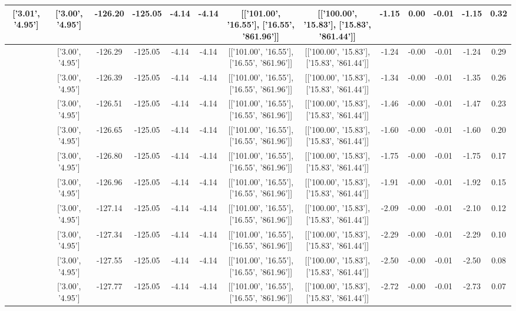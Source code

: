 \begin{table}[htbp]
\begin{adjustbox}{angle=90}
\begin{tabular}{|c|c|c|c|c|c|c|c|c|c|c|c|c|}
 ['3.01', '4.95'] & ['3.00', '4.95'] & -126.20 & -125.05 & -4.14 & -4.14 & [['101.00', '16.55'], ['16.55', '861.96']] & [['100.00', '15.83'], ['15.83', '861.44']] & -1.15 & 0.00 & -0.01 & -1.15 & 0.32\\ \hline
 ['3.01', '4.95'] & ['3.00', '4.95'] & -126.29 & -125.05 & -4.14 & -4.14 & [['101.00', '16.55'], ['16.55', '861.96']] & [['100.00', '15.83'], ['15.83', '861.44']] & -1.24 & -0.00 & -0.01 & -1.24 & 0.29\\ \hline
 ['3.01', '4.95'] & ['3.00', '4.95'] & -126.39 & -125.05 & -4.14 & -4.14 & [['101.00', '16.55'], ['16.55', '861.96']] & [['100.00', '15.83'], ['15.83', '861.44']] & -1.34 & -0.00 & -0.01 & -1.35 & 0.26\\ \hline
 ['3.01', '4.95'] & ['3.00', '4.95'] & -126.51 & -125.05 & -4.14 & -4.14 & [['101.00', '16.55'], ['16.55', '861.96']] & [['100.00', '15.83'], ['15.83', '861.44']] & -1.46 & -0.00 & -0.01 & -1.47 & 0.23\\ \hline
 ['3.01', '4.95'] & ['3.00', '4.95'] & -126.65 & -125.05 & -4.14 & -4.14 & [['101.00', '16.55'], ['16.55', '861.96']] & [['100.00', '15.83'], ['15.83', '861.44']] & -1.60 & -0.00 & -0.01 & -1.60 & 0.20\\ \hline
 ['3.01', '4.95'] & ['3.00', '4.95'] & -126.80 & -125.05 & -4.14 & -4.14 & [['101.00', '16.55'], ['16.55', '861.96']] & [['100.00', '15.83'], ['15.83', '861.44']] & -1.75 & -0.00 & -0.01 & -1.75 & 0.17\\ \hline
 ['3.01', '4.95'] & ['3.00', '4.95'] & -126.96 & -125.05 & -4.14 & -4.14 & [['101.00', '16.55'], ['16.55', '861.96']] & [['100.00', '15.83'], ['15.83', '861.44']] & -1.91 & -0.00 & -0.01 & -1.92 & 0.15\\ \hline
 ['3.01', '4.95'] & ['3.00', '4.95'] & -127.14 & -125.05 & -4.14 & -4.14 & [['101.00', '16.55'], ['16.55', '861.96']] & [['100.00', '15.83'], ['15.83', '861.44']] & -2.09 & -0.00 & -0.01 & -2.10 & 0.12\\ \hline
 ['3.02', '4.95'] & ['3.00', '4.95'] & -127.34 & -125.05 & -4.14 & -4.14 & [['101.00', '16.55'], ['16.55', '861.96']] & [['100.00', '15.83'], ['15.83', '861.44']] & -2.29 & -0.00 & -0.01 & -2.29 & 0.10\\ \hline
 ['3.02', '4.95'] & ['3.00', '4.95'] & -127.55 & -125.05 & -4.14 & -4.14 & [['101.00', '16.55'], ['16.55', '861.96']] & [['100.00', '15.83'], ['15.83', '861.44']] & -2.50 & -0.00 & -0.01 & -2.50 & 0.08\\ \hline
 ['3.02', '4.96'] & ['3.00', '4.95'] & -127.77 & -125.05 & -4.14 & -4.14 & [['101.00', '16.55'], ['16.55', '861.96']] & [['100.00', '15.83'], ['15.83', '861.44']] & -2.72 & -0.00 & -0.01 & -2.73 & 0.07\\ \hline

\end{tabular}
\end{adjustbox}
\end{table}
